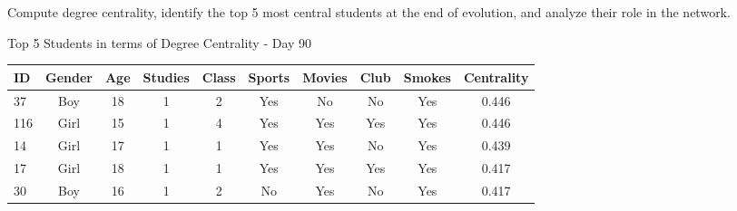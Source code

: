 \begin{question}
\begin{subquestion}{Compute degree centrality, identify the top 5 most central students at the end of evolution,
			and analyze their role in the network.}
{			%
			\begin{center}								
				Top 5 Students in terms of Degree Centrality - Day 90
				\begin{tabular}{lccccccccc}
					\hline					
					ID & Gender & Age & Studies & Class & Sports & Movies & Club & Smokes & Centrality \\
					\hline
					37 & Boy & 18 & 1 & 2 & Yes & No & No & Yes & 0.446 \\
					116 & Girl & 15 & 1 & 4 & Yes & Yes & Yes & Yes & 0.446 \\
					14 & Girl & 17 & 1 & 1 & Yes & Yes & No & Yes & 0.439 \\
					17 & Girl & 18 & 1 & 1 & Yes & Yes & Yes & Yes & 0.417 \\
					30 & Boy & 16 & 1 & 2 & No & Yes & No & Yes & 0.417 \\
					\hline					
				\end{tabular}
				\label{table:d90}
			\end{center}
		
}
\end{subquestion}
\end{question}
